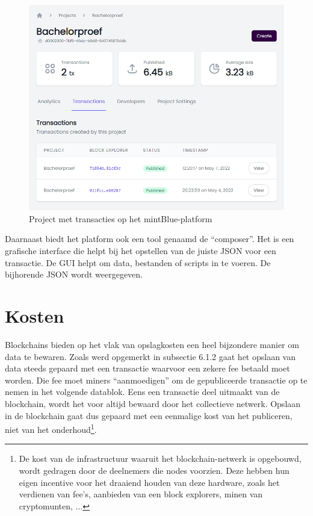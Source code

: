 \begin{figure}[H]
	\centering
	\includegraphics[width=\linewidth]{img/proof-of-concept/mintblue-project.png}
	\caption{\label{fig:mintblue-project}Project met transacties op het mintBlue-platform}
\end{figure}

Daarnaast biedt het platform ook een tool genaamd de ``composer''. Het is een grafische interface die helpt bij het opstellen van de juiste JSON voor een transactie. De GUI helpt om data, bestanden of scripts in te voeren. De bijhorende JSON wordt weergegeven.


\section{Kosten}
\label{sub:kosten}

Blockchains bieden op het vlak van opslagkosten een heel bijzondere manier om data te bewaren. Zoals werd opgemerkt in subsectie 6.1.2 gaat het opslaan van data steeds gepaard met een transactie waarvoor een zekere fee betaald moet worden. Die fee moet miners ``aanmoedigen'' om de gepubliceerde transactie op te nemen in het volgende datablok. Eens een transactie deel uitmaakt van de blockchain, wordt het voor altijd bewaard door het collectieve netwerk. Opslaan in de blockchain gaat dus gepaard met een eenmalige kost van het publiceren, niet van het onderhoud\footnote{De kost van de infrastructuur waaruit het blockchain-netwerk is opgebouwd, wordt gedragen door de deelnemers die nodes voorzien. Deze hebben hun eigen incentive voor het draaiend houden van deze hardware, zoals het verdienen van fee's, aanbieden van een block explorers, minen van cryptomunten, ...}. 

